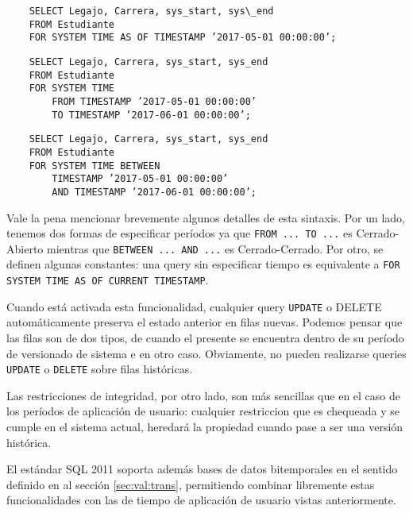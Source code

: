 \begin{verbatim}
    SELECT Legajo, Carrera, sys_start, sys\_end
    FROM Estudiante
    FOR SYSTEM TIME AS OF TIMESTAMP ’2017-05-01 00:00:00’;
\end{verbatim}

\begin{verbatim}
    SELECT Legajo, Carrera, sys_start, sys_end
    FROM Estudiante
    FOR SYSTEM TIME
        FROM TIMESTAMP ’2017-05-01 00:00:00’
        TO TIMESTAMP ’2017-06-01 00:00:00’;
\end{verbatim}


\begin{verbatim}
    SELECT Legajo, Carrera, sys_start, sys_end
    FROM Estudiante
    FOR SYSTEM TIME BETWEEN
        TIMESTAMP ’2017-05-01 00:00:00’
        AND TIMESTAMP ’2017-06-01 00:00:00’;
\end{verbatim}

Vale la pena mencionar brevemente algunos detalles de esta sintaxis.
Por un lado, tenemos dos formas de especificar períodos ya que \texttt{FROM ... TO ...} es Cerrado-Abierto
mientras que \texttt{BETWEEN ... AND ...} es Cerrado-Cerrado.
Por otro, se definen algunas constantes:
una query sin especificar tiempo es equivalente a \texttt{FOR SYSTEM TIME AS OF CURRENT TIMESTAMP}.

Cuando está activada esta funcionalidad, cualquier query \texttt{UPDATE} o DELETE automáticamente preserva el estado anterior en filas nuevas.
Podemos pensar que las filas son de dos tipos,
de  cuando el presente se encuentra dentro de su período de versionado de sistema
e  en otro caso.
Obviamente, no pueden realizarse queries \texttt{UPDATE} o \texttt{DELETE} sobre filas históricas.

Las restricciones de integridad, por otro lado, son más sencillas que en el caso de los períodos de aplicación de usuario:
cualquier restriccion que es chequeada y se cumple en el sistema actual, heredará la propiedad cuando pase a ser una versión histórica.

El estándar SQL 2011 soporta además bases de datos bitemporales en el sentido definido en al sección \ref{sec:val:trans},
permitiendo combinar libremente estas funcionalidades con las de tiempo de aplicación de usuario vistas anteriormente.